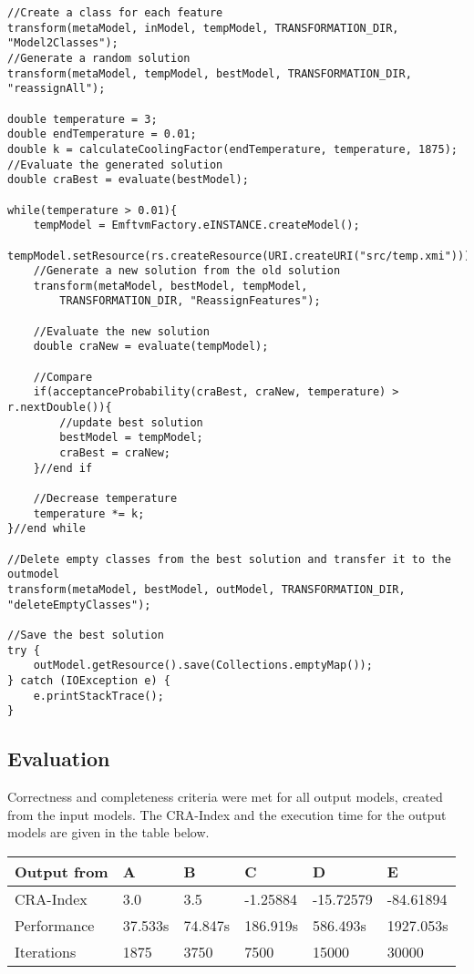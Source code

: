 \documentclass[a4paper]{article}
\begin{document}
\begin{lstlisting}
//Create a class for each feature
transform(metaModel, inModel, tempModel, TRANSFORMATION_DIR, "Model2Classes");
//Generate a random solution
transform(metaModel, tempModel, bestModel, TRANSFORMATION_DIR, "reassignAll");

double temperature = 3;
double endTemperature = 0.01;
double k = calculateCoolingFactor(endTemperature, temperature, 1875);
//Evaluate the generated solution
double craBest = evaluate(bestModel);

while(temperature > 0.01){
	tempModel = EmftvmFactory.eINSTANCE.createModel();
	tempModel.setResource(rs.createResource(URI.createURI("src/temp.xmi")));
	//Generate a new solution from the old solution
	transform(metaModel, bestModel, tempModel,
		TRANSFORMATION_DIR, "ReassignFeatures");

	//Evaluate the new solution
	double craNew = evaluate(tempModel);

	//Compare
	if(acceptanceProbability(craBest, craNew, temperature) > r.nextDouble()){
		//update best solution
		bestModel = tempModel;
		craBest = craNew;
	}//end if

	//Decrease temperature
	temperature *= k;
}//end while

//Delete empty classes from the best solution and transfer it to the outmodel
transform(metaModel, bestModel, outModel, TRANSFORMATION_DIR,
"deleteEmptyClasses");

//Save the best solution
try {
	outModel.getResource().save(Collections.emptyMap());
} catch (IOException e) {
	e.printStackTrace();
}
\end{lstlisting}

\subsection{Evaluation}

Correctness and completeness criteria were met for all output models, created from the input models.
The CRA-Index and the execution time for the output models are given in the table below.

\begin{table}[h]
\begin{center}
\begin{tabular}{|l|l|l|l|l|l|}
\hline
Output from & A & B & C & D & E\\
\hline
CRA-Index & 3.0 & 3.5 & -1.25884 & -15.72579 & -84.61894\\
\hline
Performance & 37.533s & 74.847s & 186.919s & 586.493s & 1927.053s\\
\hline
Iterations & 1875 & 3750 & 7500 & 15000 & 30000\\
\hline
\end{tabular}
\end{center}
\end{table}

\nocite{*}

 

\end{document}
